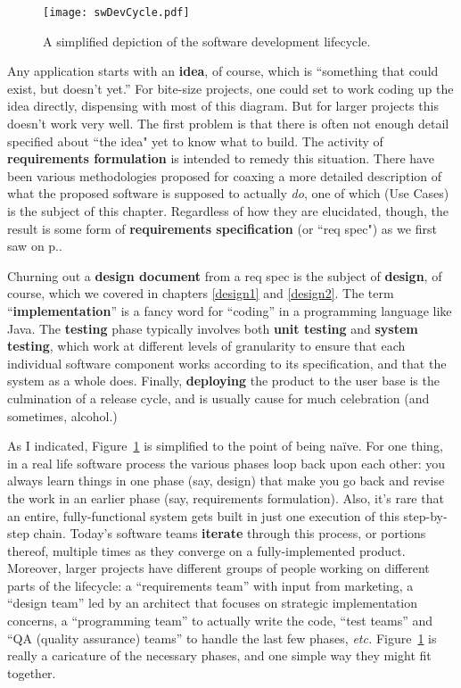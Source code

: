 \begin{figure}
\centering
\texttt{[image: swDevCycle.pdf]}
\caption{A simplified depiction of the software development lifecycle.}
\label{fig:swDevCycle}
\end{figure}

Any application starts with an \textbf{idea}, of course, which is ``something
that could exist, but doesn't yet.'' For bite-size projects, one could set to
work coding up the idea directly, dispensing with most of this diagram. But
for larger projects this doesn't work very well. The first problem is that
there is often not enough detail specified about ``the idea" yet to know what
to build. The activity of \textbf{requirements formulation} is intended to
remedy this situation. There have been various methodologies proposed for
coaxing a more detailed description of what the proposed software is supposed
to actually \textit{do}, one of which (Use Cases) is the subject of this
chapter. Regardless of how they are elucidated, though, the result is some
form of \textbf{requirements specification} (or ``req spec") as we first saw
on p.\pageref{reqSpec}.

Churning out a \textbf{design document} from a req spec is the subject of
\textbf{design}, of course, which we covered in chapters \ref{design1} and
\ref{design2}. The term ``\textbf{implementation}'' is a fancy word for
``coding'' in a programming language like Java. The \textbf{testing} phase
typically involves both \textbf{unit testing} and \textbf{system testing},
which work at different levels of granularity to ensure that each individual
software component works according to its specification, and that the system
as a whole does. Finally, \textbf{deploying} the product to the user base is
the culmination of a release cycle, and is usually cause for much celebration
(and sometimes, alcohol.)

As I indicated, Figure~\ref{fig:swDevCycle} is simplified to the point of
being na\"{i}ve. For one thing, in a real life software process the various
phases loop back upon each other: you always learn things in one phase (say,
design) that make you go back and revise the work in an earlier phase (say,
requirements formulation). Also, it's rare that an entire, fully-functional
system gets built in just one execution of this step-by-step chain. Today's
software teams \textbf{iterate} through this process, or portions thereof,
multiple times as they converge on a fully-implemented product. Moreover,
larger projects have different groups of people working on different parts of
the lifecycle: a ``requirements team'' with input from marketing, a ``design
team'' led by an architect that focuses on strategic implementation concerns,
a ``programming team'' to actually write the code, ``test teams'' and ``QA
(quality assurance) teams'' to handle the last few phases, \textit{etc.}
Figure~\ref{fig:swDevCycle} is really a caricature of the necessary phases,
and one simple way they might fit together.

